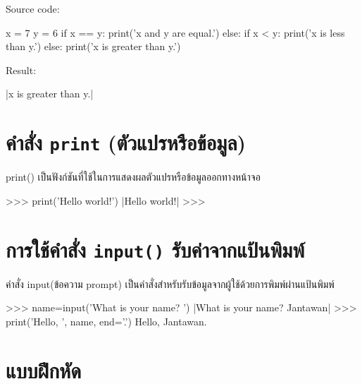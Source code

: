 Source code:

\begin{pycode}
x = 7
y = 6
if x == y: print('x and y are equal.')
else:
    if x < y: print('x is less than y.')
    else: print('x is greater than y.')
\end{pycode}

Result:

\begin{pycode}
|x is greater than y.|
\end{pycode}


\section{คำสั่ง \texttt{print} (ตัวแปรหรือข้อมูล)}

print() เป็นฟังก์ชันที่ใช้ในการแสดงผลตัวแปรหรือข้อมูลออกทางหน้าจอ 

\begin{pycode}
>>> print('Hello world!')
|Hello world!|
>>>
\end{pycode}


\section{การใช้คำสั่ง \texttt{input()} รับค่าจากแป้นพิมพ์}

คำสั่ง input(ข้อความ prompt) เป็นคำสั่งสำหรับรับข้อมูลจากผู้ใช้ด้วยการพิมพ์ผ่านแป้นพิมพ์ 

\begin{pycode}
>>> name=input('What is your name? ')
|What is your name? Jantawan|
>>> print('Hello, ', name, end='.')
Hello, Jantawan.
\end{pycode}


\section{แบบฝึกหัด}

